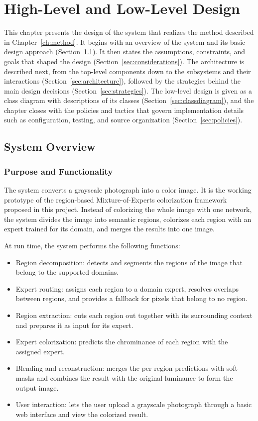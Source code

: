 \documentclass{FastFyp}
\begin{document}
\chapter{High-Level and Low-Level Design}
\label{ch:design}
This chapter presents the design of the system that realizes the method described in Chapter~\ref{ch:method}. It begins with an overview of the system and its basic design approach (Section~\ref{sec:sysoverview}). It then states the assumptions, constraints, and goals that shaped the design (Section~\ref{sec:considerations}). The architecture is described next, from the top-level components down to the subsystems and their interactions (Section~\ref{sec:architecture}), followed by the strategies behind the main design decisions (Section~\ref{sec:strategies}). The low-level design is given as a class diagram with descriptions of its classes (Section~\ref{sec:classdiagram}), and the chapter closes with the policies and tactics that govern implementation details such as configuration, testing, and source organization (Section~\ref{sec:policies}).

\section{System Overview}
\label{sec:sysoverview}

\subsection{Purpose and Functionality}

The system converts a grayscale photograph into a color image. It is the working prototype of the region-based Mixture-of-Experts colorization framework proposed in this project. Instead of colorizing the whole image with one network, the system divides the image into semantic regions, colorizes each region with an expert trained for its domain, and merges the results into one image.

At run time, the system performs the following functions:

\begin{itemize}
    \item Region decomposition: detects and segments the regions of the image that belong to the supported domains.
    \item Expert routing: assigns each region to a domain expert, resolves overlaps between regions, and provides a fallback for pixels that belong to no region.
    \item Region extraction: cuts each region out together with its surrounding context and prepares it as input for its expert.
    \item Expert colorization: predicts the chrominance of each region with the assigned expert.
    \item Blending and reconstruction: merges the per-region predictions with soft masks and combines the result with the original luminance to form the output image.
    \item User interaction: lets the user upload a grayscale photograph through a basic web interface and view the colorized result.
\end{itemize}
\end{document}
